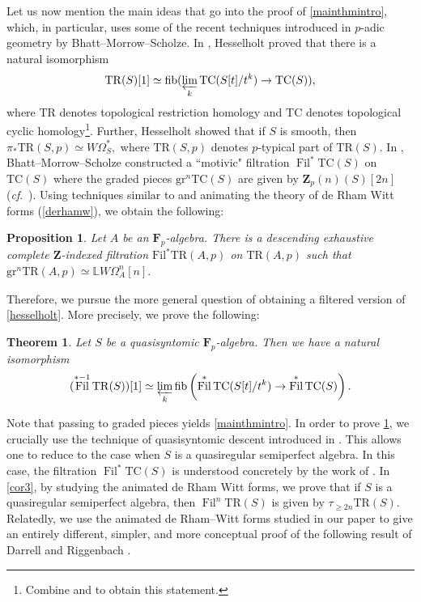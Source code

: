 \documentclass[10pt,letterpaper]{amsart}
\numberwithin{figure}{section}
\numberwithin{equation}{section}
\newtheorem{theorem}[figure]{Theorem}
\newtheorem{proposition}[figure]{Proposition}
\theoremstyle{definition}
\theoremstyle{definition}
\theoremstyle{definition}
\theoremstyle{definition}
\DeclareMathOperator{\Fil}{Fil}
\newcommand{\TR}{\mathrm{TR}}
\newcommand{\TC}{\mathrm{TC}}
\renewcommand{\L}{\mathbb{L}}
\newcommand{\Z}{\mathbf{Z}}
\newcommand{\F}{\mathbf{F}}
\begin{document}
Let us now mention the main ideas that go into the proof of \cref{mainthmintro}, which, in particular, uses some of the recent techniques introduced in $p$-adic geometry by Bhatt--Morrow--Scholze. In \cite{Hess}, Hesselholt proved that there is a natural isomorphism 
\begin{equation}\label{hesselholt}
    \TR(S)[1]\simeq  \mathrm{fib} (\varprojlim_k \TC (S[t]/t^k) \to \TC(S)),
\end{equation}where $\TR$ denotes topological restriction homology and $\TC$ denotes topological cyclic homology\footnote{Combine \cite[Thm.~3.1.9]{Hess} and \cite[Thm.~3.1.10]{Hess} to obtain this statement.}. Further, Hesselholt \cite[Thm.~C]{Hess} showed that if $S$ is smooth, then $\pi_* \TR(S,p) \simeq W\Omega^*_S,$ where $\TR(S,p)$ denotes $p$-typical part of $\TR(S).$ In \cite{BMS2}, Bhatt--Morrow--Scholze constructed a ``motivic" filtration $\Fil^* \TC (S)$ on $\TC(S)$ where the graded pieces $\mathrm{gr}^n \TC(S)$ are given by $\Z_p (n)(S)[2n]$ (\textit{cf}.~\cite{Ben, arpon}). Using techniques similar to \cite{BMS2} and animating the theory of de Rham Witt forms (\cref{derhamw}), we obtain the following:
\begin{proposition}
      Let $A$ be an $\F_p$-algebra. There is a descending exhaustive complete $\Z$-indexed filtration $\mathrm{Fil}^*_\mathrm{} \TR(A,p)$ on $\TR(A,p)$ such that $\mathrm{gr}^n_\mathrm{} \TR(A,p) \simeq \L W\Omega^n_A [n].$ 
\end{proposition}{}

 Therefore, we pursue the more general question of obtaining a filtered version of \cref{hesselholt}. More precisely, we prove the following:

\begin{theorem}\label{mainthm2intro}
  Let $S$ be a quasisyntomic $\F_p$-algebra. Then  we have a natural isomorphism $$ (\Fil^{*-1} \TR(S))[1] \simeq \varprojlim_k \mathrm{fib} \left(\Fil^* \TC(S[t]/t^k) \to \Fil^* \TC(S)\right).$$  
\end{theorem}{}
Note that passing to graded pieces yields \cref{mainthmintro}. In order to prove \cref{mainthm2intro}, we crucially use the technique of quasisyntomic descent introduced in \cite{BMS2}. This allows one to reduce to the case when $S$ is a quasiregular semiperfect algebra. In this case, the filtration $\Fil^* \TC(S)$ is understood concretely by the work of \cite{BMS2}. In \cref{cor3}, by studying the animated de Rham Witt forms, we prove that if $S$ is a quasiregular semiperfect algebra, then $\Fil^n \TR(S)$ is given by $\tau_{\ge 2n} \TR(S)$. Relatedly, we use the animated de Rham--Witt forms studied in our paper to give an entirely different, simpler, and more conceptual proof of the following result of Darrell and Riggenbach \cite[Thm.~A]{Noah}.
\end{document}
